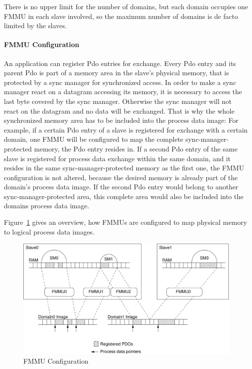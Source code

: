 \documentclass[a4paper,12pt,BCOR6mm,bibtotoc,idxtotoc]{scrbook}
\begin{document}
There is no upper limit for the number of domains, but each domain occupies
one FMMU in each slave involved, so the maximum number of domains is de facto
limited by the slaves.

\paragraph{FMMU Configuration}

An application can register Pdo entries for exchange. Every Pdo entry and its
parent Pdo is part of a memory area in the slave's physical memory, that is
protected by a sync manager \cite[sec.~6.7]{dlspec} for synchronized access.
In order to make a sync manager react on a datagram accessing its memory, it
is necessary to access the last byte covered by the sync manager. Otherwise
the sync manager will not react on the datagram and no data will be exchanged.
That is why the whole synchronized memory area has to be included into the
process data image: For example, if a certain Pdo entry of a slave is
registered for exchange with a certain domain, one FMMU will be configured to
map the complete sync-manager-protected memory, the Pdo entry resides in. If a
second Pdo entry of the same slave is registered for process data exchange
within the same domain, and it resides in the same sync-manager-protected
memory as the first one, the FMMU configuration is not altered, because the
desired memory is already part of the domain's process data image. If the
second Pdo entry would belong to another sync-manager-protected area, this
complete area would also be included into the domains process data image.

Figure~\ref{fig:fmmus} gives an overview, how FMMUs are configured to map
physical memory to logical process data images.

\begin{figure}[htbp]
  \centering
  \includegraphics[width=\textwidth]{images/fmmus}
  \caption{FMMU Configuration}
  \label{fig:fmmus}
\end{figure}
\end{document}
